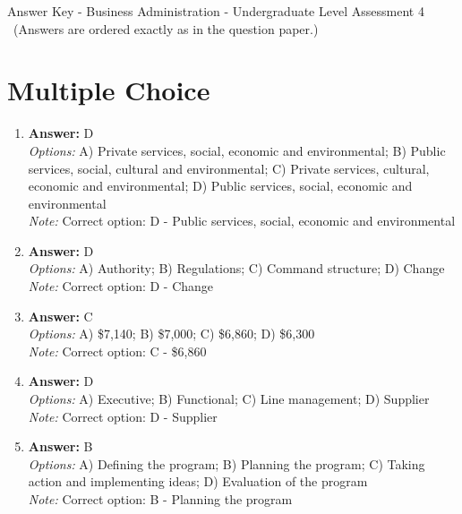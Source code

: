 \documentclass[12pt]{article}
\begin{document}
\begin{center}
Answer Key - Business Administration - Undergraduate Level Assessment 4 \
\small (Answers are ordered exactly as in the question paper.)
\end{center}

\section*{Multiple Choice}
\begin{enumerate}[label=\arabic*.]
\item \textbf{Answer:} D
\\ \textit{Options:} A) Private services, social, economic and environmental; B) Public services, social, cultural and environmental; C) Private services, cultural, economic and environmental; D) Public services, social, economic and environmental
\\ \textit{Note:} Correct option: D - Public services, social, economic and environmental
\item \textbf{Answer:} D
\\ \textit{Options:} A) Authority; B) Regulations; C) Command structure; D) Change
\\ \textit{Note:} Correct option: D - Change
\item \textbf{Answer:} C
\\ \textit{Options:} A) \$7,140; B) \$7,000; C) \$6,860; D) \$6,300
\\ \textit{Note:} Correct option: C - \$6,860
\item \textbf{Answer:} D
\\ \textit{Options:} A) Executive; B) Functional; C) Line management; D) Supplier
\\ \textit{Note:} Correct option: D - Supplier
\item \textbf{Answer:} B
\\ \textit{Options:} A) Defining the program; B) Planning the program; C) Taking action and implementing ideas; D) Evaluation of the program
\\ \textit{Note:} Correct option: B - Planning the program
\end{enumerate}
\end{document}
